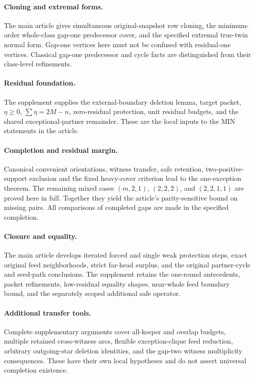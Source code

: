 \paragraph{Cloning and extremal forms.}
The main article gives simultaneous original-snapshot row cloning, the
minimum-order whole-class gap-one predecessor cover, and the specified
extremal true-twin normal form. Gap-one vertices here must not be confused
with residual-one vertices. Classical gap-one predecessor and cycle facts
are distinguished from their class-level refinements.

\paragraph{Residual foundation.}
The supplement supplies the external-boundary deletion lemma, target
packet, \(\eta\ge0\), \(\sum\eta=2M-n\), zero-residual protection,
unit residual budgets, and the shared exceptional-partner remainder.
These are the local inputs to the MIN statements in the article.

\paragraph{Completion and residual margin.}
Canonical convenient orientations, witness transfer, safe retention,
two-positive-support exclusion and the fixed heavy-cover criterion lead
to the one-exception theorem. The remaining mixed cases
\((m,2,1)\), \((2,2,2)\), and \((2,2,1,1)\) are proved here in full.
Together they yield the article's parity-sensitive bound on missing
pairs. All comparisons of completed gaps are made in the specified
completion.

\paragraph{Closure and equality.}
The main article develops iterated forced and single weak protection
steps, exact original feed neighborhoods, strict far-head surplus, and
the original partner-cycle and seed-path conclusions. The supplement
retains the one-round antecedents, packet refinements, low-residual
equality shapes, near-whole feed boundary bound, and the separately
scoped additional safe operator.

\paragraph{Additional transfer tools.}
Complete supplementary arguments cover all-keeper and overlap budgets,
multiple retained cross-witness arcs, flexible exception-clique feed
reduction, arbitrary outgoing-star deletion identities, and the
gap-two witness multiplicity consequences. These have their own
local hypotheses and do not assert universal completion existence.

